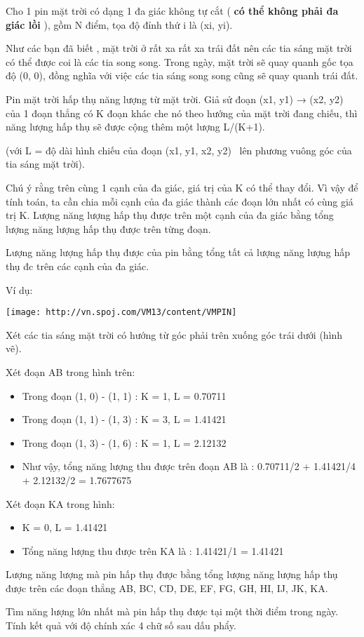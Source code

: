 Cho 1 pin mặt trời có dạng 1 đa giác không tự cắt (   \textbf{    có thể không phải đa giác lồi   }   ), gồm N điểm, tọa độ đỉnh thứ i là (xi, yi).  

   Như các bạn đã biết , mặt trời ở rất xa rất xa trái đất nên các tia sáng mặt trời có thể được coi là các tia song song. Trong ngày, mặt trời sẽ quay quanh gốc tọa độ (0, 0), đồng nghĩa với việc các tia sáng song song cũng sẽ quay quanh trái đất.  

   Pin mặt trời hấp thụ năng lượng từ mặt trời. Giả sử đoạn (x1, y1) → (x2, y2) của 1 đoạn thẳng có K đoạn khác che nó theo hướng của mặt trời đang chiếu, thì năng lượng hấp thụ sẽ được cộng thêm một lượng L/(K+1).  

   (với L = độ dài hình chiếu của đoạn (x1, y1, x2, y2)  lên phương vuông góc của tia sáng mặt trời).  

   Chú ý rằng trên cùng 1 cạnh của đa giác, giá trị của K có thể thay đổi. Vì vậy để tính toán, ta cần chia mỗi cạnh của đa giác thành các đoạn lớn nhất có cùng giá trị K. Lượng năng lượng hấp thụ được trên một cạnh của đa giác bằng tổng lượng năng lượng hấp thụ được trên từng đoạn.  

   Lượng năng lượng hấp thụ được của pin bằng tổng tất cả lượng năng lượng hấp thụ đc trên các cạnh của đa giác.  

   Ví dụ:  


\texttt{[image: http://vn.spoj.com/VM13/content/VMPIN]}

   Xét các tia sáng mặt trời có hướng từ góc phải trên xuống góc trái dưới (hình vẽ).  

   Xét đoạn AB trong hình trên:  
\begin{itemize}
	\item     Trong đoạn (1, 0) - (1, 1) : K = 1, L = 0.70711   
	\item     Trong đoạn (1, 1) - (1, 3) : K = 3, L = 1.41421   
	\item     Trong đoạn (1, 3) - (1, 6) : K = 1, L = 2.12132   
	\item     Như vậy, tổng năng lượng thu được trên đoạn AB là : 0.70711/2 + 1.41421/4 + 2.12132/2 = 1.7677675   
\end{itemize}

   Xét đoạn KA trong hình:  
\begin{itemize}
	\item     K = 0, L = 1.41421   
	\item     Tổng năng lượng thu được trên KA là : 1.41421/1 = 1.41421   
\end{itemize}

   Lượng năng lượng mà pin hấp thụ được bằng tổng lượng năng lượng hấp thụ được trên các đoạn thẳng AB, BC, CD, DE, EF, FG, GH, HI, IJ, JK, KA.  

   Tìm năng lượng lớn nhất mà pin hấp thụ được tại một thời điểm trong ngày. Tính kết quả với độ chính xác 4 chữ số sau dấu phẩy.